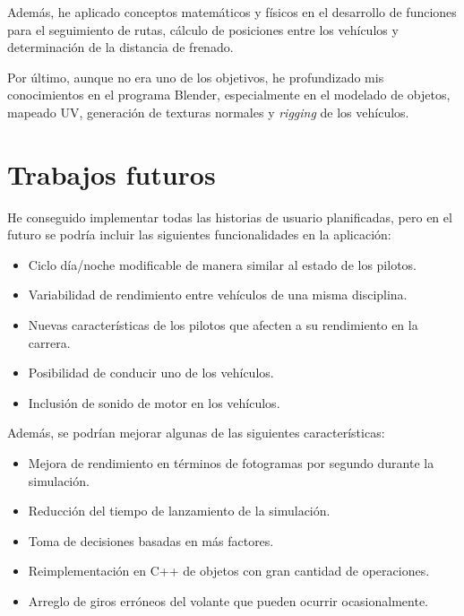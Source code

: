 Además, he aplicado conceptos matemáticos y físicos en el desarrollo de funciones para el seguimiento de rutas, cálculo de posiciones entre los vehículos y determinación de la distancia de frenado.

\bigskip

Por último, aunque no era uno de los objetivos, he profundizado mis conocimientos en el programa Blender, especialmente en el modelado de objetos, mapeado UV, generación de texturas normales y \textit{rigging} de los vehículos.  


\section{Trabajos futuros}

He conseguido implementar todas las historias de usuario planificadas, pero en el futuro se podría incluir las siguientes funcionalidades en la aplicación:

\begin{itemize}
    \item Ciclo día/noche modificable de manera similar al estado de los pilotos.
    \item Variabilidad de rendimiento entre vehículos de una misma disciplina.
    \item Nuevas características de los pilotos que afecten a su rendimiento en la carrera.
    \item Posibilidad de conducir uno de los vehículos.
    \item Inclusión de sonido de motor en los vehículos.
\end{itemize}

\bigskip

Además, se podrían mejorar algunas de las siguientes características:

\begin{itemize}
    \item Mejora de rendimiento en términos de fotogramas por segundo durante la simulación.
    \item Reducción del tiempo de lanzamiento de la simulación.
    \item Toma de decisiones basadas en más factores.
    \item Reimplementación en C++ de objetos con gran cantidad de operaciones.
    \item Arreglo de giros erróneos del volante que pueden ocurrir ocasionalmente.
\end{itemize}